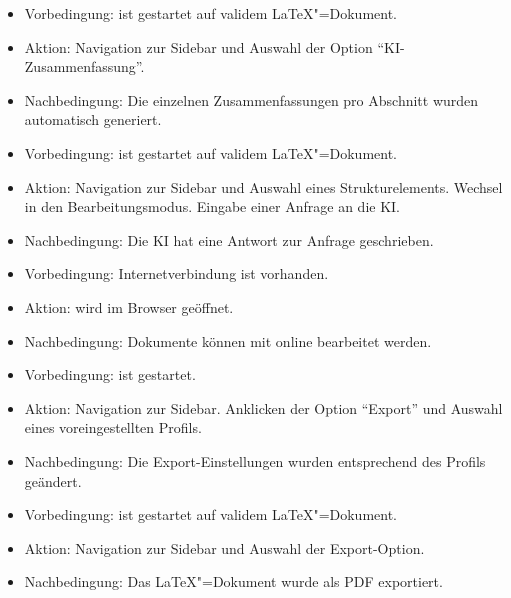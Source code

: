 \begin{itemize}
  \item Vorbedingung: \texla{} ist gestartet auf validem \LaTeX"=Dokument.
  \item Aktion: Navigation zur Sidebar und Auswahl der Option \enquote{KI-Zusammenfassung}.
  \item Nachbedingung: Die einzelnen Zusammenfassungen pro Abschnitt wurden automatisch generiert.
\end{itemize}

\begin{itemize}
  \item Vorbedingung: \texla{} ist gestartet auf validem \LaTeX"=Dokument.
  \item Aktion: Navigation zur Sidebar und Auswahl eines Strukturelements.
  Wechsel in den Bearbeitungsmodus.
  Eingabe einer Anfrage an die KI.
  \item Nachbedingung: Die KI hat eine Antwort zur Anfrage geschrieben.
\end{itemize}

\begin{itemize}
  \item Vorbedingung: Internetverbindung ist vorhanden.
  \item Aktion: \texla{} wird im Browser geöffnet.
  \item Nachbedingung: Dokumente können mit \texla{} online bearbeitet werden.
\end{itemize}

\clearpage

\begin{itemize}
  \item Vorbedingung: \texla{} ist gestartet.
  \item Aktion: Navigation zur Sidebar.
  Anklicken der Option \enquote{Export} und Auswahl eines voreingestellten Profils.
  \item Nachbedingung: Die Export-Einstellungen wurden entsprechend des Profils geändert.
\end{itemize}

\begin{itemize}
  \item Vorbedingung: \texla{} ist gestartet auf validem \LaTeX"=Dokument.
  \item Aktion: Navigation zur Sidebar und Auswahl der Export-Option.
  \item Nachbedingung: Das \LaTeX"=Dokument wurde als PDF exportiert.
\end{itemize}


